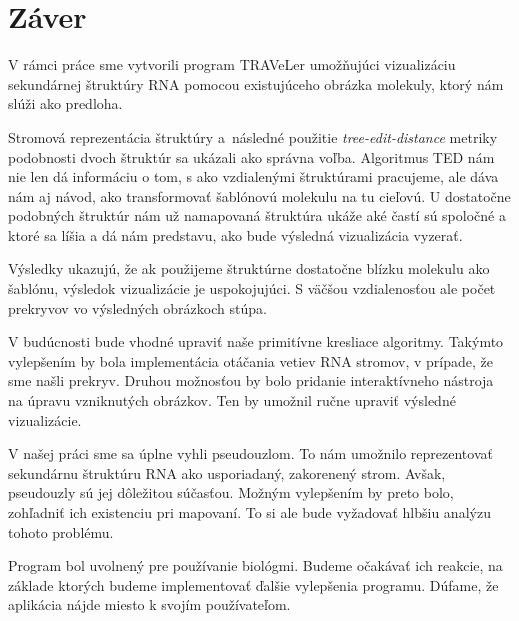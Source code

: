 \chapter*{Záver}

V rámci práce sme vytvorili program TRAVeLer umožňujúci
vizualizáciu sekundárnej štruktúry RNA pomocou existujúceho
obrázka molekuly, ktorý nám slúži ako predloha.

Stromová reprezentácia štruktúry a~následné
použitie \textit{tree-edit-distance} metriky podobnosti dvoch
štruktúr sa ukázali ako správna voľba.
Algoritmus TED nám nie len dá informáciu o tom,
s ako vzdialenými štruktúrami pracujeme, ale dáva nám
aj návod, ako transformovať šablónovú molekulu na tu cieľovú.
U dostatočne podobných štruktúr nám už namapovaná štruktúra
ukáže aké častí sú spoločné a ktoré sa líšia a dá nám
predstavu, ako bude výsledná vizualizácia vyzerať.

Výsledky ukazujú, že ak použijeme štruktúrne dostatočne blízku
molekulu ako šablónu, výsledok vizualizácie je uspokojujúci.
S väčšou vzdialenosťou ale počet prekryvov vo výsledných obrázkoch
stúpa.

V budúcnosti bude vhodné upraviť naše primitívne kresliace algoritmy.
Takýmto vylepšením by bola implementácia otáčania vetiev RNA stromov,
v prípade, že sme našli prekryv.
Druhou možnosťou by bolo pridanie interaktívneho nástroja na úpravu
vzniknutých obrázkov. Ten by umožnil ručne upraviť výsledné vizualizácie.

V našej práci sme sa úplne vyhli pseudouzlom. To nám umožnilo
reprezentovať sekundárnu štruktúru RNA ako usporiadaný, zakorenený strom.
Avšak, pseudouzly sú jej dôležitou súčasťou.
Možným vylepšením by preto bolo, zohľadniť ich existenciu pri mapovaní.
To si ale bude vyžadovať hlbšiu analýzu tohoto problému.

Program bol uvolnený pre používanie biológmi. Budeme očakávať ich reakcie,
na základe ktorých budeme implementovať ďalšie vylepšenia programu.
Dúfame, že aplikácia nájde miesto k svojím používateľom.

